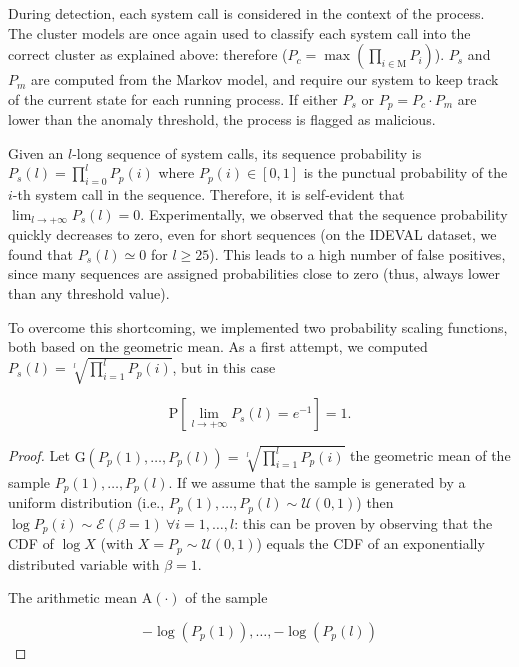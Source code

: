 During detection, each system call is considered in the context of the process. The cluster models are once again used to classify each system call into the correct cluster as explained above: therefore ($P_c = \max(\prod_{i \in \mathrm{M}}{P_i})$). $P_s$ and $P_m$ are computed from the Markov model, and require our system to keep track of the current state for each running process. If either $P_s$ or $P_p = P_c \cdot P_m$ are lower than the anomaly threshold, the process is flagged as malicious.  

\begin{note}
Given an $l$-long sequence of system calls, its sequence probability is $P_{s}(l) = \prod_{i = 0}^{l} P_{p}(i)$ where $P_{p}(i) \in [0,1]$ is the punctual probability of the $i$-th system call in the sequence. Therefore, it is self-evident that $\lim_{l \to +\infty} P_{s}(l) = 0$. Experimentally, we observed that the sequence probability quickly decreases to zero, even for short sequences (on the \ac{IDEVAL} dataset, we found that $P_{s}(l) \simeq 0$ for $l \geq 25$). This leads to a high number of false positives, since many sequences are assigned probabilities close to zero (thus, always lower than any threshold value).

To overcome this shortcoming, we implemented two probability scaling functions, both based on the geometric mean. As a first attempt, we computed $P_{s}(l) = \sqrt[l]{\prod_{i = 1}^{l} P_{p}(i)}$, but in this case

\begin{displaymath}
  \mathrm{P}\left[\lim_{l \to +\infty} P_{s}(l) = e^{-1}\right] = 1.
\end{displaymath}

\begin{proof}
  Let $\mathrm{G}(P_{p}(1), \ldots, P_{p}(l)) = \sqrt[l]{\prod_{i = 1}^{l} P_{p}(i)}$ the geometric mean of the sample $P_{p}(1), \ldots, P_{p}(l)$. If we assume that the sample is generated by a uniform distribution (i.e., $P_{p}(1), \ldots, P_{p}(l) \sim \mathcal{U}(0,1)$) then $\log P_{p}(i) \sim \mathcal{E}(\beta = 1) \: \forall i = 1, \ldots, l$: this can be proven by observing that the \ac{CDF} \citep{pestman} of $\log X$ (with $X = P_{p} \sim \mathcal{U}(0,1)$) equals the \ac{CDF} of an exponentially distributed variable with $\beta = 1$.

  The arithmetic mean $\mathrm{A}(\cdot)$ of the sample

  \begin{displaymath}
    -\log(P_{p}(1)), \ldots, -\log(P_{p}(l))
  \end{displaymath}


\end{proof}
\end{note}
